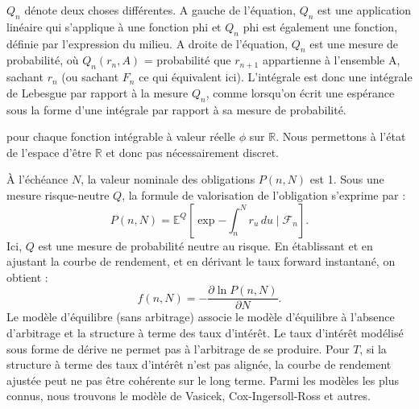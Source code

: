$Q_n$ dénote deux choses différentes. A gauche de l'équation, $Q_n$ est une application linéaire qui s'applique à une fonction phi et $Q_n$ phi est également une fonction, définie par l'expression du milieu. A droite de l'équation, $Q_n$ est une mesure de probabilité, où $Q_n(r_n, A)$ = probabilité que $r_{n+1}$ appartienne à l'ensemble A, sachant $r_n$ (ou sachant $F_n$ ce qui équivalent ici). L'intégrale est donc une intégrale de Lebesgue par rapport à la mesure $Q_n$, comme lorsqu'on écrit une espérance sous la forme d'une intégrale par rapport à sa mesure de probabilité. 

pour chaque fonction intégrable à valeur réelle $\phi$ sur $\mathbb{R}$. Nous permettons à l'état de l'espace d'être $\mathbb{R}$ et donc pas nécessairement discret.

À l'échéance \( N \), la valeur nominale des obligations \( P(n, N) \) est 1. Sous une mesure risque-neutre \( Q \), la formule de valorisation de l'obligation s'exprime par :
\[
P(n, N) = \mathbb{E}^Q \left[ \exp{-\int_n^N r_u \, du} \mid \mathcal{F}_n \right].
\]
Ici, \( Q \) est une mesure de probabilité neutre au risque. En établissant et en ajustant la courbe de rendement, et en dérivant le taux forward instantané, on obtient :
\[
f(n, N) = -\frac{\partial \ln P(n, N)}{\partial N}.
\]
Le modèle d'équilibre (sans arbitrage) associe le modèle d'équilibre à l'absence d'arbitrage et la structure à terme des taux d'intérêt. Le taux d'intérêt modélisé sous forme de dérive ne permet pas à l'arbitrage de se produire. Pour \( T \), si la structure à terme des taux d'intérêt n'est pas alignée, la courbe de rendement ajustée peut ne pas être cohérente sur le long terme. Parmi les modèles les plus connus, nous trouvons le modèle de Vasicek, Cox-Ingersoll-Ross et autres.

